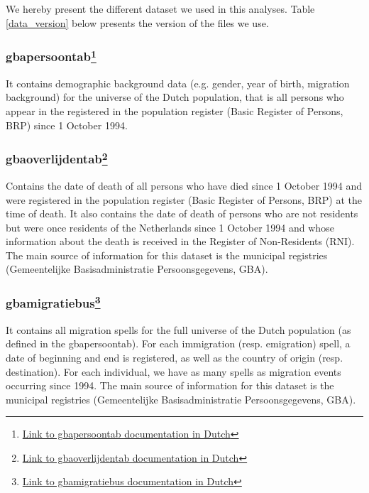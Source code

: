 \documentclass[12pt,a4paper]{article}
\begin{document}
We hereby present the different dataset we used in this analyses. Table \ref{data_version} below presents the version of the files we use. 


\subsubsection*{gbapersoontab\footnote{\hyperlink{ https://www.cbs.nl/nl-nl/onze-diensten/maatwerk-en-microdata/microdata-zelf-onderzoek-doen/microdatabestanden/gbapersoontab-persoonskenmerken-van-personen-in-de-brp}{Link to gbapersoontab documentation in Dutch}}}

It contains demographic background data (e.g. gender, year of birth, migration background) for the universe of the Dutch population, that is  all persons who appear in the registered in the population register (Basic Register of Persons, BRP) since 1 October 1994. 

\subsubsection*{gbaoverlijdentab\footnote{\hyperlink{ https://www.cbs.nl/nl-nl/onze-diensten/maatwerk-en-microdata/microdata-zelf-onderzoek-doen/microdatabestanden/gbaoverlijdentab-datum-van-overlijden-van-personen-die-ingeschreven-staan-in-de-gba}{Link to gbaoverlijdentab documentation in Dutch}}}

Contains the date of death of all persons who have died since 1 October 1994 and were registered in the population register (Basic Register of Persons, BRP) at the time of death. It also contains the date of death of persons who are not residents but were once residents of the Netherlands since 1 October 1994 and whose information about the death is received in the Register of Non-Residents (RNI). The main source of information for this dataset is the municipal registries (Gemeentelijke Basisadministratie Persoonsgegevens, GBA).


\subsubsection*{gbamigratiebus\footnote{\hyperlink{ https://www.cbs.nl/nl-nl/onze-diensten/maatwerk-en-microdata/microdata-zelf-onderzoek-doen/microdatabestanden/gbamigratiebus-migratiekenmerken-van-personen}{Link to gbamigratiebus documentation in Dutch}}}

It contains all migration spells for the full universe of the Dutch population (as defined in the gbapersoontab). For each immigration (resp. emigration) spell, a date of beginning and end is registered, as well as the country of origin (resp. destination). For each individual, we have as many spells as migration events occurring since 1994. The main source of information for this dataset is the municipal registries (Gemeentelijke Basisadministratie Persoonsgegevens, GBA).
\end{document}
